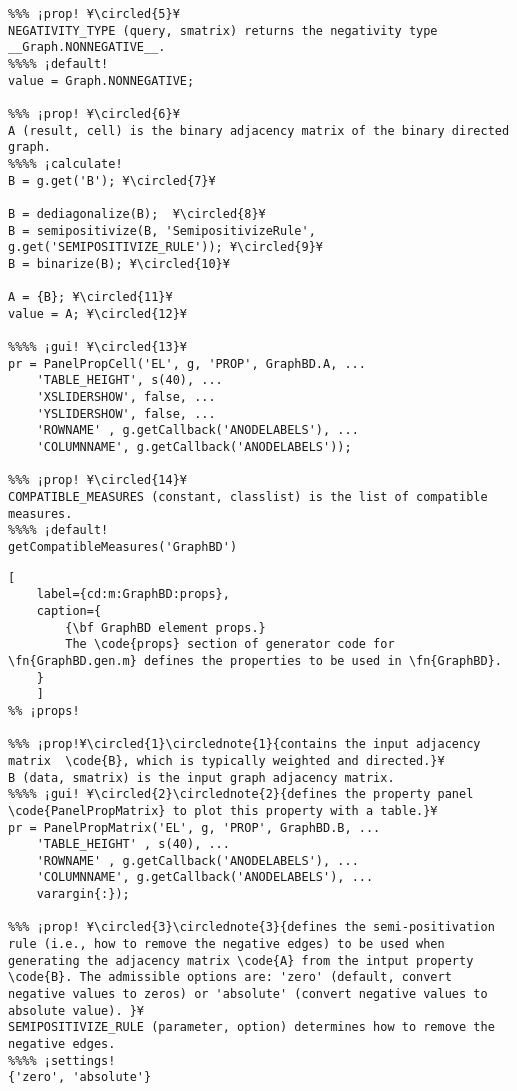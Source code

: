 \documentclass{tufte-handout}
\begin{document}
\begin{lstlisting}
%%% ¡prop! ¥\circled{5}¥
NEGATIVITY_TYPE (query, smatrix) returns the negativity type __Graph.NONNEGATIVE__.
%%%% ¡default!
value = Graph.NONNEGATIVE;

%%% ¡prop! ¥\circled{6}¥
A (result, cell) is the binary adjacency matrix of the binary directed graph.
%%%% ¡calculate!
B = g.get('B'); ¥\circled{7}¥

B = dediagonalize(B);  ¥\circled{8}¥
B = semipositivize(B, 'SemipositivizeRule', g.get('SEMIPOSITIVIZE_RULE')); ¥\circled{9}¥
B = binarize(B); ¥\circled{10}¥

A = {B}; ¥\circled{11}¥
value = A; ¥\circled{12}¥

%%%% ¡gui! ¥\circled{13}¥
pr = PanelPropCell('EL', g, 'PROP', GraphBD.A, ... 
	'TABLE_HEIGHT', s(40), ... 
	'XSLIDERSHOW', false, ... 
	'YSLIDERSHOW', false, ...  
	'ROWNAME' , g.getCallback('ANODELABELS'), ... 
	'COLUMNNAME', g.getCallback('ANODELABELS'));

%%% ¡prop! ¥\circled{14}¥
COMPATIBLE_MEASURES (constant, classlist) is the list of compatible measures.
%%%% ¡default!
getCompatibleMeasures('GraphBD')
\end{lstlisting}

\begin{lstlisting}[
	label={cd:m:GraphBD:props},
	caption={
		{\bf GraphBD element props.}
		The \code{props} section of generator code for \fn{GraphBD.gen.m} defines the properties to be used in \fn{GraphBD}.
	}
	]
%% ¡props!

%%% ¡prop!¥\circled{1}\circlednote{1}{contains the input adjacency matrix  \code{B}, which is typically weighted and directed.}¥
B (data, smatrix) is the input graph adjacency matrix.
%%%% ¡gui! ¥\circled{2}\circlednote{2}{defines the property panel \code{PanelPropMatrix} to plot this property with a table.}¥
pr = PanelPropMatrix('EL', g, 'PROP', GraphBD.B, ... 
	'TABLE_HEIGHT' , s(40), ...
	'ROWNAME' , g.getCallback('ANODELABELS'), ... 
	'COLUMNNAME', g.getCallback('ANODELABELS'), ...
	varargin{:});

%%% ¡prop! ¥\circled{3}\circlednote{3}{defines the semi-positivation rule (i.e., how to remove the negative edges) to be used when generating the adjacency matrix \code{A} from the intput property \code{B}. The admissible options are: 'zero' (default, convert negative values to zeros) or 'absolute' (convert negative values to absolute value). }¥
SEMIPOSITIVIZE_RULE (parameter, option) determines how to remove the negative edges.
%%%% ¡settings!
{'zero', 'absolute'}
\end{lstlisting}
\end{document}
